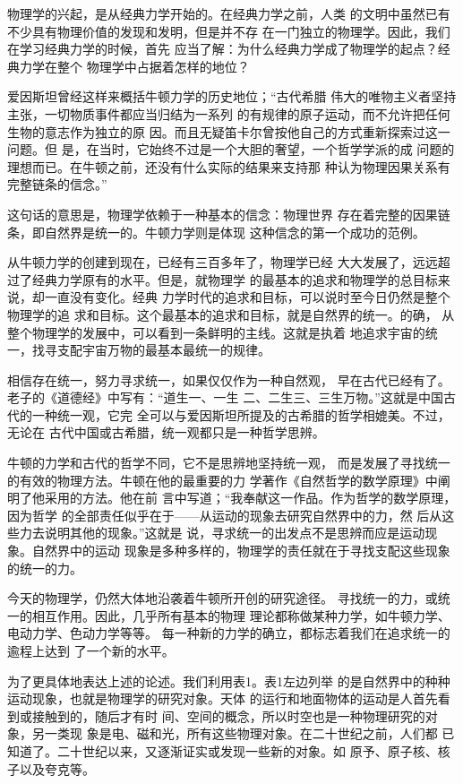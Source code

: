\label{chp:00}

物理学的兴起，是从经典力学开始的。在经典力学之前，人类
的文明中虽然已有不少具有物理价值的发现和发明，但是并不存
在一门独立的物理学。因此，我们在学习经典力学的时候，首先
应当了解：为什么经典力学成了物理学的起点？经典力学在整个
物理学中占据着怎样的地位？

爱因斯坦曾经这样来概括牛顿力学的历史地位；“古代希腊
伟大的唯物主义者坚持主张，一切物质事件都应当归结为一系列
的有规律的原子运动，而不允许把任何生物的意志作为独立的原
因。而且无疑笛卡尔曾按他自己的方式重新探索过这一问题。但
是，在当时，它始终不过是一个大胆的奢望，一个哲学学派的成
问题的理想而已。在牛顿之前，还没有什么实际的结果来支持那
种认为物理因果关系有完整链条的信念。”

这句话的意思是，物理学依赖于一种基本的信念：物理世界
存在着完整的因果链条，即自然界是统一的。牛顿力学则是体现
这种信念的第一个成功的范例。

从牛顿力学的创建到现在，已经有三百多年了，物理学已经
大大发展了，远远超过了经典力学原有的水平。但是，就物理学
的最基本的追求和物理学的总目标来说，却一直没有变化。经典
力学时代的追求和目标，可以说时至今日仍然是整个物理学的追
求和目标。这个最基本的追求和目标，就是自然界的统一。的确，
从整个物理学的发展中，可以看到一条鲜明的主线。这就是执着%
地追求宇宙的统一，找寻支配宇宙万物的最基本最统一的规律。

相信存在统一，努力寻求统一，如果仅仅作为一种自然观，
早在古代已经有了。老子的《道德经》中写有：“道生一、一生
二、二生三、三生万物。”这就是中国古代的一种统一观，它完
全可以与爱因斯坦所提及的古希腊的哲学相媲美。不过，无论在
古代中国或古希腊，统一观都只是一种哲学思辨。

牛顿的力学和古代的哲学不同，它不是思辨地坚持统一观，
而是发展了寻找统一的有效的物理方法。牛顿在他的最重要的力
学著作《自然哲学的数学原理》中阐明了他采用的方法。他在前
言中写道；“我奉献这一作品。作为哲学的数学原理，因为哲学
的全部责任似乎在于——从运动的现象去研究自然界中的力，然
后从这些力去说明其他的现象。”这就是
说，寻求统一的出发点不是思辨而应是运动现象。自然界中的运动
现象是多种多样的，物理学的责任就在于寻找支配这些现象的统一的力。

今天的物理学，仍然大体地沿袭着牛顿所开创的研究途径。
寻找统一的力，或统一的相互作用。因此，几乎所有基本的物理
理论都称做某种力学，如牛顿力学、电动力学、色动力学等等。
每一种新的力学的确立，都标志着我们在追求统一的逾程上达到
了一个新的水平。

为了更具体地表达上述的论述。我们利用表1。表1左边列举
的是自然界中的种种运动现象，也就是物理学的研究对象。天体
的运行和地面物体的运动是人首先看到或接触到的，随后才有时
间、空间的概念，所以时空也是一种物理研究的对象，另一类现
象是电、磁和光，所有这些物理对象。在二十世纪之前，人们都
已知道了。二十世纪以来，又逐渐证实或发现一些新的对象。如
原予、原子核、核子以及夸克等。


